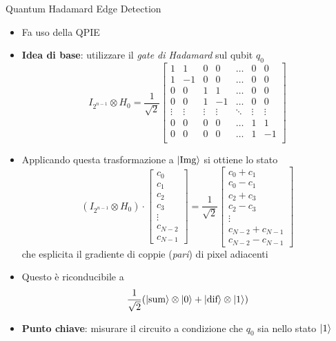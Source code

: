 \begin{frame}[allowframebreaks]{Quantum Hadamard Edge Detection}
	\begin{itemize}
		\item Fa uso della QPIE
		\item \textbf{Idea di base}: utilizzare il \emph{gate di Hadamard} sul qubit $q_0$
		\[
		I_{2^{n-1}} \otimes H_0 = \frac{1}{\sqrt 2}\begin{bmatrix}
			1 & 1 & 0 & 0 & \ldots & 0 & 0\\
			1 & -1 & 0 & 0 & \ldots & 0 & 0\\
			0 & 0 & 1 & 1 & \ldots & 0 & 0\\
			0 & 0 & 1 & -1 & \ldots & 0 & 0\\
			\vdots & \vdots & \vdots & \vdots & \ddots & \vdots & \vdots\\
			0 & 0 & 0 & 0 & \ldots & 1 & 1\\
			0 & 0 & 0 & 0 & \ldots & 1 & -1\\
		\end{bmatrix}
		\]
		\item Applicando questa trasformazione a $\lvert\text{Img}\rangle$ si ottiene lo
		stato
		\[
		(I_{2^{n-1}} \otimes H_0) \cdot \begin{bmatrix}
			c_0\\ c_1\\ c_2\\ c_3\\ \vdots\\ c_{N-2}\\ c_{N-1}
		\end{bmatrix} = \frac{1}{\sqrt 2} \begin{bmatrix}
			c_0+c_1\\ c_0-c_1\\ c_2+c_3\\ c_2-c_3\\ \vdots\\ c_{N-2}+c_{N-1}\\ c_{N-2}-c_{N-1}
		\end{bmatrix}
		\]
		che esplicita il gradiente di coppie (\emph{pari}) di
		pixel adiacenti
		\item Questo è riconducibile a
		\[
		\frac{1}{\sqrt 2} (\lvert\text{sum}\rangle \otimes \lvert0\rangle
		+ \lvert\text{dif}\rangle \otimes \lvert1\rangle)
		\]
		\item \textbf{Punto chiave}: misurare il circuito a condizione che $q_0$
		sia nello stato $\lvert1\rangle$
	\end{itemize}
\end{frame}

